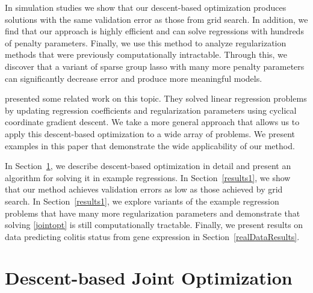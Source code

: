 \documentclass[12pt,letterpaper]{article}
\begin{document}
In simulation studies we show that our descent-based optimization produces solutions with the same validation error as those from grid search. In addition, we find that our approach is highly efficient and can solve regressions with hundreds of penalty parameters. Finally, we use this method to analyze regularization methods that were previously computationally intractable. Through this, we discover that a variant of sparse group lasso with many more penalty parameters can significantly decrease error and produce more meaningful models.

\citet{lorbert2010descent} presented some related work on this topic. They solved linear regression problems by updating regression coefficients and regularization parameters using cyclical coordinate gradient descent. We take a more general approach that allows us to apply this descent-based optimization to a wide array of problems. We present examples in this paper that demonstrate the wide applicability of our method.

In Section~\ref{defineDescJointOpt}, we describe descent-based optimization in detail and present an algorithm for solving it in example regressions. In Section~\ref{results1}, we show that our method achieves validation errors as low as those achieved by grid search. In Section~\ref{results1}, we explore variants of the example regression problems that have many more regularization parameters and demonstrate that solving \eqref{jointopt} is still computationally tractable. Finally, we present results on data predicting colitis status from gene expression in Section~\ref{realDataResults}.

\section{Descent-based Joint Optimization}\label{defineDescJointOpt}
\end{document}
